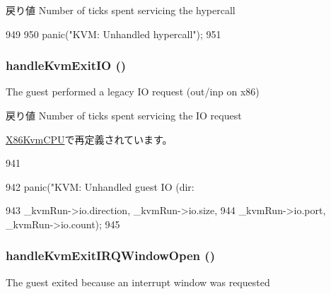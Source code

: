 \begin{DoxyReturn}{戻り値}
Number of ticks spent servicing the hypercall 
\end{DoxyReturn}



\begin{DoxyCode}
949 {
950     panic("KVM: Unhandled hypercall\n");
951 }
\end{DoxyCode}
\hypertarget{classBaseKvmCPU_a404fbd80d6676724d026a932b2258dc7}{
\subsubsection[{handleKvmExitIO}]{ handleKvmExitIO ()}}
\label{classBaseKvmCPU_a404fbd80d6676724d026a932b2258dc7}
The guest performed a legacy IO request (out/inp on x86)

\begin{DoxyReturn}{戻り値}
Number of ticks spent servicing the IO request 
\end{DoxyReturn}


\hyperlink{classX86KvmCPU_a404fbd80d6676724d026a932b2258dc7}{X86KvmCPU}で再定義されています。


\begin{DoxyCode}
941 {
942     panic("KVM: Unhandled guest IO (dir: %
      
943           _kvmRun->io.direction, _kvmRun->io.size,
944           _kvmRun->io.port, _kvmRun->io.count);
945 }
\end{DoxyCode}
\hypertarget{classBaseKvmCPU_a405e34c9d079e8823ac2a1ca0e816a47}{
\subsubsection[{handleKvmExitIRQWindowOpen}]{ handleKvmExitIRQWindowOpen ()}}
\label{classBaseKvmCPU_a405e34c9d079e8823ac2a1ca0e816a47}
The guest exited because an interrupt window was requested

